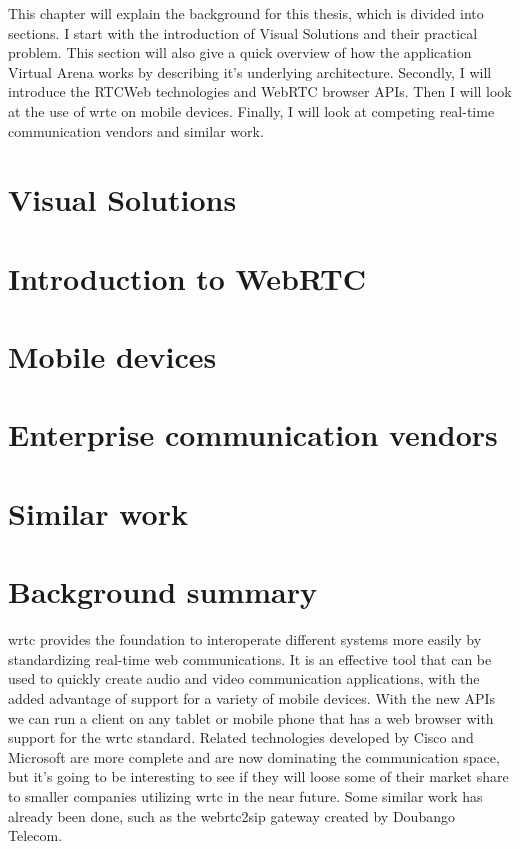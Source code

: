 
This chapter will explain the background for this thesis, which is divided into sections. I start with the introduction of Visual Solutions and their practical problem. This section will also give a quick overview of how the application Virtual Arena works by describing it's underlying architecture. Secondly, I will introduce the RTCWeb technologies and WebRTC browser APIs. Then I will look at the use of \gls{wrtc} on mobile devices. Finally, I will look at competing real-time communication vendors and similar work.

\section{Visual Solutions}


\newpage
\section{Introduction to WebRTC}


\newpage
\section{Mobile devices}


\newpage
\section{Enterprise communication vendors}


\newpage
\section{Similar work}


\newpage
\section{Background summary}
\gls{wrtc} provides the foundation to interoperate different systems more easily by standardizing real-time web communications. It is an effective tool that can be used to quickly create audio and video communication applications, with the added advantage of support for a variety of mobile devices. With the new APIs we can run a client on any tablet or mobile phone that has a web browser with support for the \gls{wrtc} standard. Related technologies developed by Cisco and Microsoft are more complete and are now dominating the communication space, but it's going to be interesting to see if they will loose some of their market share to smaller companies utilizing \gls{wrtc} in the near future. Some similar work has already been done, such as the webrtc2sip gateway created by Doubango Telecom.

